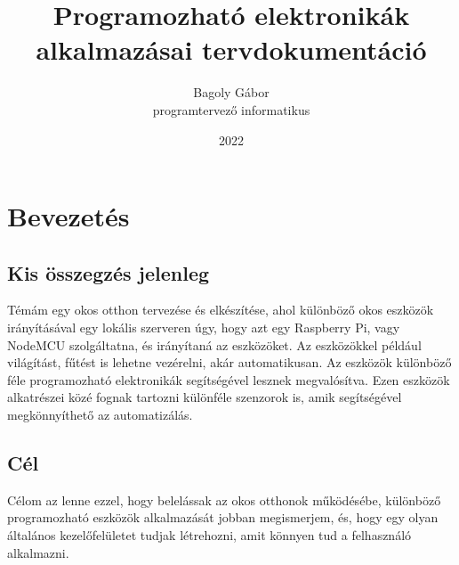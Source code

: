 \documentclass[
]{thesis-ekf}
\theoremstyle{definition}
\theoremstyle{remark}
\begin{document}
\title{Programozható elektronikák alkalmazásai tervdokumentáció}
\author{Bagoly Gábor\\programtervező informatikus}
\date{2022}
\maketitle
\tableofcontents

\chapter*{Bevezetés}
\section*{Kis összegzés jelenleg}

Témám egy okos otthon tervezése és elkészítése, ahol különböző okos eszközök irányításával egy lokális szerveren
úgy, hogy azt egy Raspberry Pi, vagy NodeMCU szolgáltatna, és irányítaná az eszközöket.
Az eszközökkel például világítást, fűtést is lehetne vezérelni, akár automatikusan. Az eszközök
különböző féle programozható elektronikák segítségével lesznek megvalósítva.
Ezen eszközök alkatrészei közé fognak tartozni különféle szenzorok is, amik segítségével
megkönnyíthető az automatizálás.
\section*{Cél}
Célom az lenne ezzel, hogy belelássak az okos otthonok működésébe, különböző programozható
eszközök alkalmazását jobban megismerjem, és, hogy egy olyan általános kezelőfelületet
tudjak létrehozni, amit könnyen tud a felhasználó alkalmazni.
\end{document}
